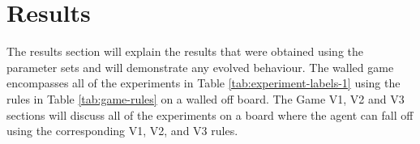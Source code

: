 \section{Results}

The results section will explain the results that were obtained using the parameter sets and will demonstrate any evolved behaviour. The walled game encompasses all of the experiments in Table \ref{tab:experiment-labels-1} using the rules in Table \ref{tab:game-rules} on a walled off board. The Game V1, V2 and V3 sections will discuss all of the experiments on a board where the agent can fall off using the corresponding V1, V2, and V3 rules.





